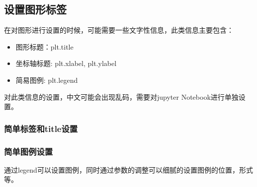 \documentclass[letterpaper,10pt,english]{sphinxhowto}
\begin{document}
\subsection{设置图形标签}
\label{\detokenize{_u56fe_u5f62_u7b80_u5355_u7ed8_u5236:id5}}
在对图形进行设置的时候，可能需要一些文字性信息，此类信息主要包含：
\begin{itemize}
\item {} 
图形标题：plt.title

\item {} 
坐标轴标题: plt.xlabel, plt.ylabel

\item {} 
简易图例: plt.legend

\end{itemize}

对此类信息的设置，中文可能会出现乱码，需要对jupyter Notebook进行单独设置。


\subsubsection{简单标签和title设置}
\label{\detokenize{_u56fe_u5f62_u7b80_u5355_u7ed8_u5236:title}}
%
\begin{sphinxVerbatim}[commandchars=\\\{\}]

  
\end{sphinxVerbatim}

%
\begin{sphinxVerbatim}[commandchars=\\\{\}]
\end{sphinxVerbatim}



\subsubsection{简单图例设置}
\label{\detokenize{_u56fe_u5f62_u7b80_u5355_u7ed8_u5236:id6}}
通过legend可以设置图例，同时通过参数的调整可以细腻的设置图例的位置，形式等。
\end{document}
